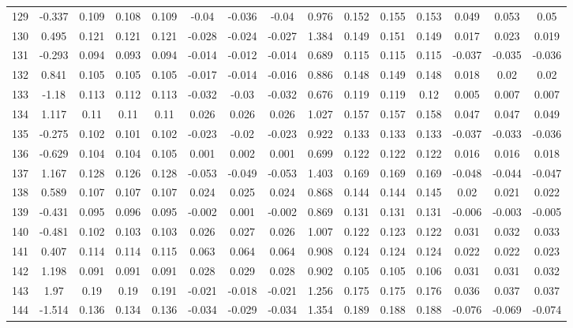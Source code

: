 \begin{table}[H]
{\begin{tabular}{l|c|ccc|ccc|c|ccc|ccc}
			129 & -0.337 & 0.109 & 0.108 & 0.109 & -0.04 & -0.036 & -0.04 & 0.976 & 0.152 & 0.155 & 0.153 & 0.049 & 0.053 & 0.05 \\
			130 & 0.495 & 0.121 & 0.121 & 0.121 & -0.028 & -0.024 & -0.027 & 1.384 & 0.149 & 0.151 & 0.149 & 0.017 & 0.023 & 0.019 \\
			131 & -0.293 & 0.094 & 0.093 & 0.094 & -0.014 & -0.012 & -0.014 & 0.689 & 0.115 & 0.115 & 0.115 & -0.037 & -0.035 & -0.036 \\
			132 & 0.841 & 0.105 & 0.105 & 0.105 & -0.017 & -0.014 & -0.016 & 0.886 & 0.148 & 0.149 & 0.148 & 0.018 & 0.02 & 0.02 \\
			133 & -1.18 & 0.113 & 0.112 & 0.113 & -0.032 & -0.03 & -0.032 & 0.676 & 0.119 & 0.119 & 0.12 & 0.005 & 0.007 & 0.007 \\
			134 & 1.117 & 0.11 & 0.11 & 0.11 & 0.026 & 0.026 & 0.026 & 1.027 & 0.157 & 0.157 & 0.158 & 0.047 & 0.047 & 0.049 \\
			135 & -0.275 & 0.102 & 0.101 & 0.102 & -0.023 & -0.02 & -0.023 & 0.922 & 0.133 & 0.133 & 0.133 & -0.037 & -0.033 & -0.036 \\
			136 & -0.629 & 0.104 & 0.104 & 0.105 & 0.001 & 0.002 & 0.001 & 0.699 & 0.122 & 0.122 & 0.122 & 0.016 & 0.016 & 0.018 \\
			137 & 1.167 & 0.128 & 0.126 & 0.128 & -0.053 & -0.049 & -0.053 & 1.403 & 0.169 & 0.169 & 0.169 & -0.048 & -0.044 & -0.047 \\
			138 & 0.589 & 0.107 & 0.107 & 0.107 & 0.024 & 0.025 & 0.024 & 0.868 & 0.144 & 0.144 & 0.145 & 0.02 & 0.021 & 0.022 \\
			139 & -0.431 & 0.095 & 0.096 & 0.095 & -0.002 & 0.001 & -0.002 & 0.869 & 0.131 & 0.131 & 0.131 & -0.006 & -0.003 & -0.005 \\
			140 & -0.481 & 0.102 & 0.103 & 0.103 & 0.026 & 0.027 & 0.026 & 1.007 & 0.122 & 0.123 & 0.122 & 0.031 & 0.032 & 0.033 \\
			141 & 0.407 & 0.114 & 0.114 & 0.115 & 0.063 & 0.064 & 0.064 & 0.908 & 0.124 & 0.124 & 0.124 & 0.022 & 0.022 & 0.023 \\
			142 & 1.198 & 0.091 & 0.091 & 0.091 & 0.028 & 0.029 & 0.028 & 0.902 & 0.105 & 0.105 & 0.106 & 0.031 & 0.031 & 0.032 \\
			143 & 1.97 & 0.19 & 0.19 & 0.191 & -0.021 & -0.018 & -0.021 & 1.256 & 0.175 & 0.175 & 0.176 & 0.036 & 0.037 & 0.037 \\
			144 & -1.514 & 0.136 & 0.134 & 0.136 & -0.034 & -0.029 & -0.034 & 1.354 & 0.189 & 0.188 & 0.188 & -0.076 & -0.069 & -0.074 \\

\end{tabular}}
\end{table}
